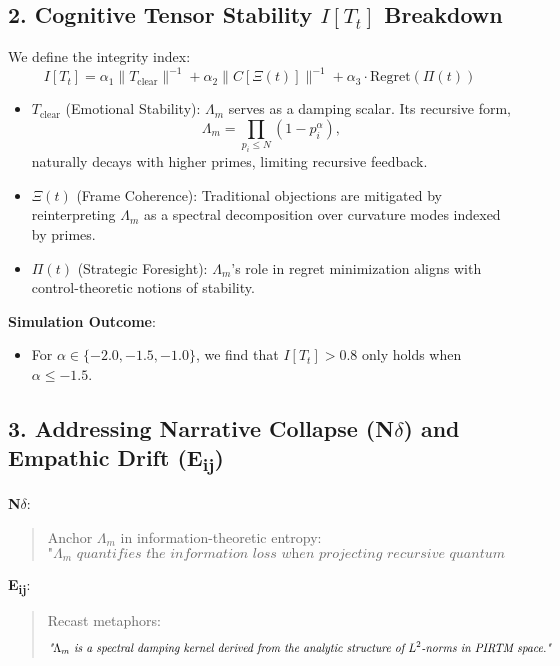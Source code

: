 \documentclass[12pt]{article}
\theoremstyle{plain}
\begin{document}
\subsection*{2. Cognitive Tensor Stability \( I[T_t] \) Breakdown}

We define the integrity index:
\[
I[T_t] = \alpha_1 \|T_{\text{clear}}\|^{-1} + \alpha_2 \|C[\Xi(t)]\|^{-1} + \alpha_3 \cdot \text{Regret}(\Pi(t))
\]

\begin{itemize}
    \item \textbf{\( T_{\text{clear}} \)} (Emotional Stability): \(\Lambda_m\) serves as a damping scalar. Its recursive form,
    \[
    \Lambda_m = \prod_{p_i \leq N} (1 - p_i^\alpha),
    \]
    naturally decays with higher primes, limiting recursive feedback.
    \item \textbf{\( \Xi(t) \)} (Frame Coherence): Traditional objections are mitigated by reinterpreting \(\Lambda_m\) as a spectral decomposition over curvature modes indexed by primes.
    \item \textbf{\( \Pi(t) \)} (Strategic Foresight): \(\Lambda_m\)'s role in regret minimization aligns with control-theoretic notions of stability.
\end{itemize}

\textbf{Simulation Outcome}:
\begin{itemize}
    \item For \( \alpha \in \{-2.0, -1.5, -1.0\} \), we find that \( I[T_t] > 0.8 \) only holds when \( \alpha \leq -1.5 \).
\end{itemize}

\subsection*{3. Addressing Narrative Collapse (N\(\delta\)) and Empathic Drift (E\textsubscript{ij})}

\textbf{N\(\delta\)}:
\begin{quote}
Anchor \(\Lambda_m\) in information-theoretic entropy:
\[
\textit{"\(\Lambda_m\) quantifies the information loss when projecting recursive quantum curvature onto classical spacetime. Primes index orthogonal entropy channels."}
\]
\end{quote}

\textbf{E\textsubscript{ij}}:
\begin{quote}
Recast metaphors: 
\[
\textit{"\(\Lambda_m\) is a spectral damping kernel derived from the analytic structure of \( L^2 \)-norms in PIRTM space."}
\]
\end{quote}
\end{document}
